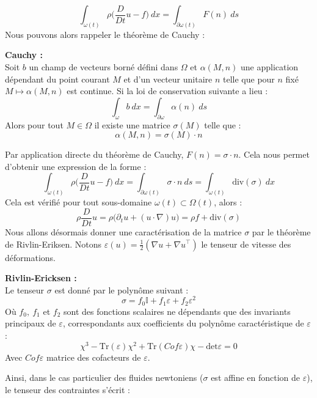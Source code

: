 $$ \int_{\omega(t)} \rho \Big( \frac{D}{Dt}u - f \Big) \ dx = \int_{\partial \omega(t)} F(n) \ ds $$
Nous pouvons alors rappeler le théorème de Cauchy :
\begin{theorembox}
    \begin{theorem}
        \textbf{Cauchy :}\\
        Soit $b$ un champ de vecteurs borné défini dans $\Omega$ et $\alpha(M,n)$ une application dépendant du point courant $M$ et d'un vecteur unitaire $n$ telle que pour $n$ fixé $M \mapsto \alpha(M,n)$ est continue.
        Si la loi de conservation suivante a lieu :
        $$ \int_{\omega} b \ dx = \int_{\partial \omega} \alpha(n) \ ds $$
        Alors pour tout $M \in \Omega$ il existe une matrice $\sigma(M)$ telle que :
        $$ \alpha(M,n) = \sigma(M)\cdot n $$
    \end{theorem}
\end{theorembox}
Par application directe du théorème de Cauchy, $F(n) = \sigma \cdot n $.
Cela nous permet d'obtenir une expression de la forme :
$$ \int_{\omega(t)} \rho \Big( \frac{D}{Dt}u - f \Big) \ dx = \int_{\partial \omega(t)} \sigma \cdot n \ ds = \int_{\omega(t)} \text{div}(\sigma) \ dx $$
Cela est vérifié pour tout sous-domaine $\omega(t) \subset \Omega(t)$, alors :
$$ \rho \frac{D}{Dt} u = \rho\big( \partial_t u + (u \cdot \nabla)u \big)  = \rho f + \text{div}(\sigma) $$
Nous allons désormais donner une caractérisation de la matrice $\sigma$ par le théorème de Rivlin-Eriksen. Notons $\mathbb{\varepsilon}(u) = \frac{1}{2}(\nabla u + \nabla u^{\top}) $ le tenseur de vitesse des déformations.
\begin{theorembox}
    \begin{theorem}
        \textbf{Rivlin-Ericksen :} \\
        Le tenseur $\sigma$ est donné par le polynôme suivant :
        $$ \sigma = f_0 \mathbb{I} + f_1 \mathbb{\varepsilon} + f_2\mathbb{\varepsilon}^2 $$
        Où $f_0, \ f_1$ et $f_2$ sont des fonctions scalaires ne dépendants que des invariants principaux de $\mathbb{\varepsilon}$, correspondants aux coefficients du polynôme caractéristique de $\mathbb{\varepsilon}$ :
        $$ \chi^3 - \text{Tr}(\varepsilon)\chi^2 + \text{Tr}(Cof \varepsilon)\chi - \text{det}\varepsilon = 0 $$
        Avec $Cof \varepsilon$ matrice des cofacteurs de $\varepsilon$.
    \end{theorem}
\end{theorembox}
Ainsi, dans le cas particulier des fluides newtoniens ($\sigma$ est affine en fonction de $\varepsilon$), le tenseur des contraintes s'écrit :

